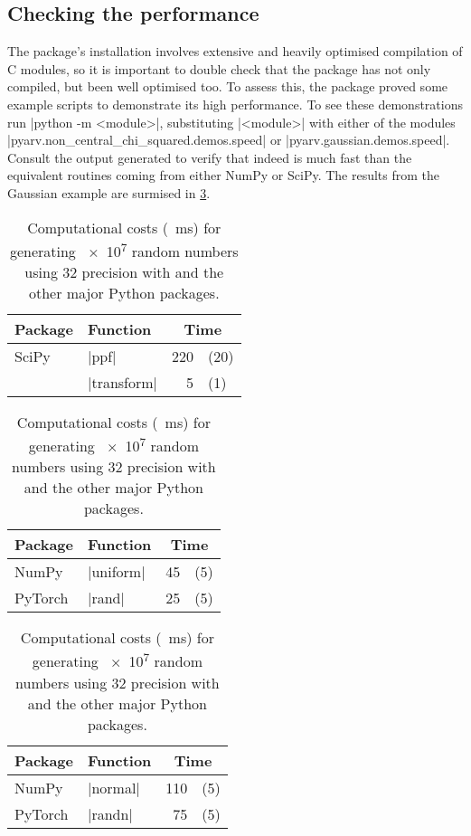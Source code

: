 \subsection{Checking the performance}
\label{sec:checking_the_performance}

The package's installation involves extensive and heavily optimised compilation of C modules, so it is important to double check that the package has not only compiled, but been well optimised too. To assess this, the package proved some example scripts to demonstrate its high performance. To see these demonstrations run 
\inlineplain|python -m <module>|, substituting \inlineplain|<module>| with either of the modules
\inlineplain|pyarv.non_central_chi_squared.demos.speed| or \inlineplain|pyarv.gaussian.demos.speed|. Consult the output generated to verify that indeed \pyarv is much fast than the equivalent routines coming from either NumPy or SciPy. The results from the Gaussian example are surmised in \cref{tabl:costs_generating_gaussian}.

\begin{table}[htb]
\centering
\begin{subtable}[t]{\linewidth}
	\centering
	\begin{tabular}{llr@{}l}
		Package & Function & \multicolumn{2}{c}{Time} \\
		\hline
		SciPy & \inlineplain|ppf| & 220 &(20) \\
		\pyarv & \inlineplain|transform| & 5 &(1) \\
	\end{tabular}
\end{subtable}
\begin{subtable}[t]{\linewidth}
	\centering
	\begin{tabular}{llr@{}l}
		Package & Function & \multicolumn{2}{c}{Time} \\
		\hline
		NumPy & \inlineplain|uniform| & 45 &(5) \\
		PyTorch & \inlineplain|rand| & 25 &(5) \\
	\end{tabular}
\end{subtable}
\begin{subtable}[t]{\linewidth}
\centering
\begin{tabular}{llr@{}l}
	Package & Function & \multicolumn{2}{c}{Time} \\
	\hline
	NumPy & \inlineplain|normal| & 110 &(5) \\
	PyTorch & \inlineplain|randn| & 75 &(5) \\
\end{tabular}
\end{subtable}
\caption{Computational costs (\qty{}{\milli\second}) for generating \qty{e7}{} random numbers using \qty{32}{\bit} precision with \pyarv and the other major Python packages.}
\label{tabl:costs_generating_gaussian}
\end{table}

